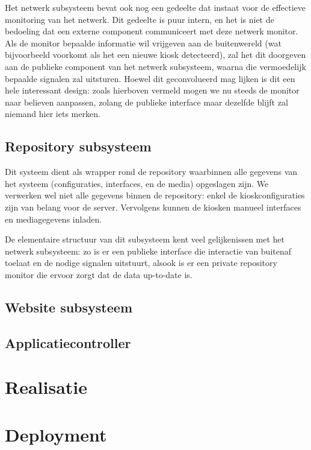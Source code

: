 Het netwerk subsysteem bevat ook nog een gedeelte dat instaat voor de effectieve monitoring van het netwerk. Dit gedeelte is puur intern, en het is niet de bedoeling dat een externe component communiceert met deze netwerk monitor. Als de monitor bepaalde informatie wil vrijgeven aan de buitenwereld (wat bijvoorbeeld voorkomt als het een nieuwe kiosk detecteerd), zal het dit doorgeven aan de publieke component van het netwerk subsysteem, waarna die vermoedelijk bepaalde signalen zal uitsturen. Hoewel dit geconvolueerd mag lijken is dit een hele interessant design: zoals hierboven vermeld mogen we nu steeds de monitor naar believen aanpassen, zolang de publieke interface maar dezelfde blijft zal niemand hier iets merken.



\section{Repository subsysteem}

Dit systeem dient als wrapper rond de repository waarbinnen alle gegevens van het systeem (configuraties, interfaces, en de media) opgeslagen zijn. We verwerken wel niet alle gegevens binnen de repository: enkel de kioskconfiguraties zijn van belang voor de server. Vervolgens kunnen de kiosken manueel interfaces en mediagegevens inladen.

De elementaire structuur van dit subsysteem kent veel gelijkenissen met het netwerk subsysteem: zo is er een publieke interface die interactie van buitenaf toelaat en de nodige signalen uitstuurt, alsook is er een private repository monitor die ervoor zorgt dat de data up-to-date is.


\section{Website subsysteem}

\section{Applicatiecontroller}


\chapter{Realisatie}


\chapter{Deployment}

